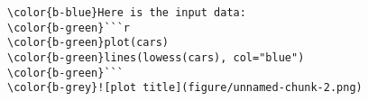 \documentclass[class=minimal,border=0]{standalone}
\begin{document}
%
\begin{BVerbatim}[bgcolor=b-darkgrey]
\color{b-blue}Here is the input data:
\color{b-green}```r
\color{b-green}plot(cars)
\color{b-green}lines(lowess(cars), col="blue")
\color{b-green}```
\color{b-grey}![plot title](figure/unnamed-chunk-2.png) 
\end{BVerbatim}
\end{document}
